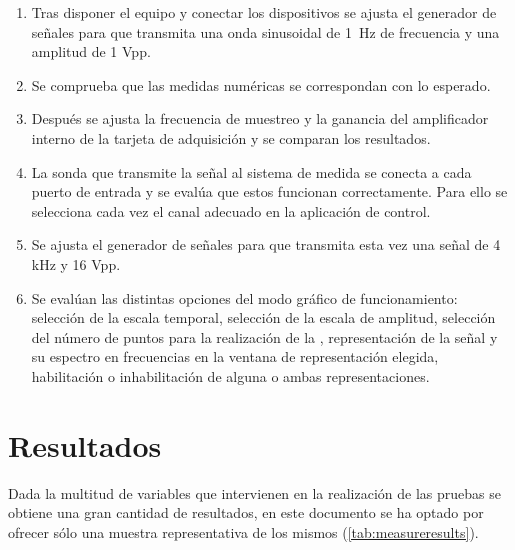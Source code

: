 \begin{enumerate}
    \item Tras disponer el equipo y conectar los dispositivos se ajusta el
	generador de señales para que transmita una onda sinusoidal de 1~Hz
	de frecuencia y una amplitud de 1 Vpp.
    \item Se comprueba que las medidas numéricas se correspondan con lo
	esperado.
    \item Después se ajusta la frecuencia de muestreo y la ganancia del
	amplificador interno de la tarjeta de adquisición y se comparan los
	resultados.
    \item La sonda que transmite la señal al sistema de medida se conecta a
	cada puerto de entrada y se evalúa que estos funcionan
	correctamente. Para ello se selecciona cada vez el canal adecuado
	en la aplicación de control.
    \item Se ajusta el generador de señales para que transmita esta vez una
	señal de 4 kHz y 16 Vpp.
    \item Se evalúan las distintas opciones del modo gráfico de
	funcionamiento: selección de la escala temporal, selección de la
	escala de amplitud, selección del número de puntos para la
	realización de la , representación de la señal y su
	espectro en frecuencias en la ventana de representación elegida,
	habilitación o inhabilitación de alguna o ambas representaciones.
\end{enumerate}


\section{Resultados}

Dada la multitud de variables que intervienen en la realización de las
pruebas se obtiene una gran cantidad de resultados, en este documento se ha
optado por ofrecer sólo una muestra representativa de los mismos
(\cref{tab:measureresults}).

